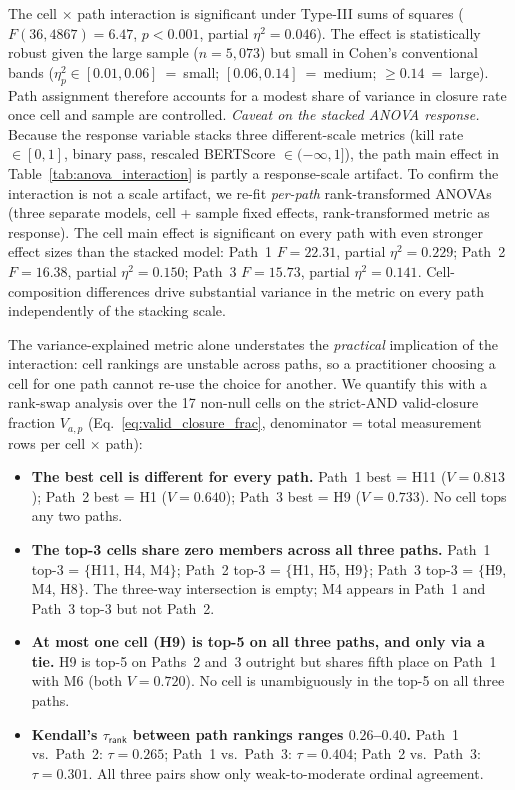 The cell $\times$ path interaction is significant under Type-III sums of squares ($F(36, 4867) = 6.47$, $p < 0.001$, partial $\eta^2 = 0.046$). The effect is statistically robust given the large sample ($n = 5{,}073$) but small in Cohen's conventional bands ($\eta^2_p \in [0.01, 0.06]$~=~small; $[0.06, 0.14]$~=~medium; $\geq 0.14$~=~large). Path assignment therefore accounts for a modest share of variance in closure rate once cell and sample are controlled. \emph{Caveat on the stacked ANOVA response.} Because the response variable stacks three different-scale metrics (kill rate $\in [0, 1]$, binary pass, rescaled BERTScore $\in (-\infty, 1]$), the path main effect in Table~\ref{tab:anova_interaction} is partly a response-scale artifact. To confirm the interaction is not a scale artifact, we re-fit \emph{per-path} rank-transformed ANOVAs (three separate models, cell + sample fixed effects, rank-transformed metric as response). The cell main effect is significant on every path with even stronger effect sizes than the stacked model: Path~1 $F = 22.31$, partial $\eta^2 = 0.229$; Path~2 $F = 16.38$, partial $\eta^2 = 0.150$; Path~3 $F = 15.73$, partial $\eta^2 = 0.141$. Cell-composition differences drive substantial variance in the metric on every path independently of the stacking scale.

The variance-explained metric alone understates the \emph{practical} implication of the interaction: cell rankings are unstable across paths, so a practitioner choosing a cell for one path cannot re-use the choice for another. We quantify this with a rank-swap analysis over the 17 non-null cells on the strict-AND valid-closure fraction $V_{a, p}$ (Eq.~\ref{eq:valid_closure_frac}, denominator = total measurement rows per cell $\times$ path):

\begin{itemize}
  \item \textbf{The best cell is different for every path.} Path~1 best = H11 ($V = 0.813$); Path~2 best = H1 ($V = 0.640$); Path~3 best = H9 ($V = 0.733$). No cell tops any two paths.
  \item \textbf{The top-3 cells share zero members across all three paths.} Path~1 top-3 = $\{$H11, H4, M4$\}$; Path~2 top-3 = $\{$H1, H5, H9$\}$; Path~3 top-3 = $\{$H9, M4, H8$\}$. The three-way intersection is empty; M4 appears in Path~1 and Path~3 top-3 but not Path~2.
  \item \textbf{At most one cell (H9) is top-5 on all three paths, and only via a tie.} H9 is top-5 on Paths~2 and~3 outright but shares fifth place on Path~1 with M6 (both $V = 0.720$). No cell is unambiguously in the top-5 on all three paths.
  \item \textbf{Kendall's $\tau_{\textsf{rank}}$ between path rankings ranges $0.26$--$0.40$.} Path~1 vs.\ Path~2: $\tau = 0.265$; Path~1 vs.\ Path~3: $\tau = 0.404$; Path~2 vs.\ Path~3: $\tau = 0.301$. All three pairs show only weak-to-moderate ordinal agreement.
\end{itemize}

